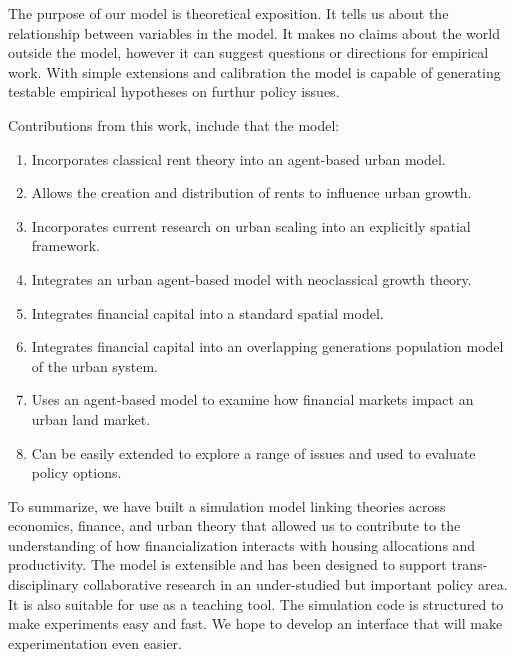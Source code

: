 The purpose of our model is \gls{theoretical exposition}. It tells us about the relationship between variables in the model.  It makes no claims about the world outside the model, however it can suggest questions or directions for empirical work. With simple extensions and calibration the model is capable of generating testable empirical hypotheses on furthur policy issues.  %

Contributions from this work, include that the model: 
\begin{enumerate}
    \item  Incorporates \gls{classical rent theory} into an \gls{agent-based} urban model. 
    
    \item Allows the creation and distribution of rents to influence urban growth. 
    
    \item Incorporates current research on \gls{urban scaling} into an explicitly spatial framework.
    
    \item Integrates an urban \gls{agent-based model} with {neoclassical growth theory}. 
    
    \item Integrates \gls{financial capital} into a standard spatial model.
    
    \item Integrates financial capital into an \gls{overlapping generations} population model of the urban system.
    
    \item Uses an agent-based model to examine how financial markets impact an urban \gls{land market}. 

    \item Can be easily extended to explore a range of issues and used to evaluate policy options. 
\end{enumerate}
To summarize, we have built a simulation model linking theories across economics, finance, and urban theory that allowed us to contribute to the understanding of how financialization interacts with housing allocations and productivity. The model is extensible and has been designed to support trans-disciplinary collaborative research in an under-studied but important policy area. It is also suitable for use as a teaching tool. The simulation code is structured to make experiments easy and fast. We hope to develop an interface that will make experimentation even easier.

